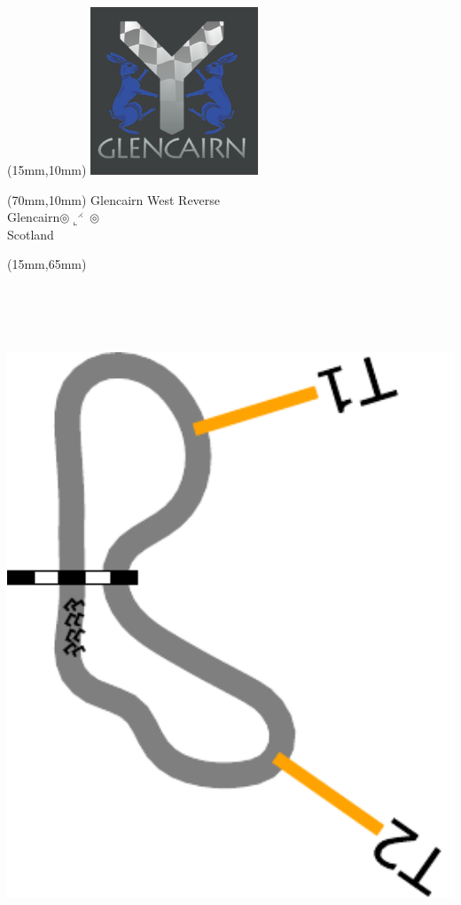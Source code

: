 \null\newpage
\begin{textblock*}{50mm}(15mm,10mm)%
\includegraphics[width=50mm]{LG/GLCN.png}
\end{textblock*}
\begin{textblock*}{130mm}(70mm,10mm)%
{\fontsize{20}{20}\selectfont Glencairn West Reverse\\}
{\fontsize{16}{16}\selectfont Glencairn\hfill $\circledcirc\llcorner^{\rightthreetimes}\circledcirc$\\}
{\fontsize{12}{12}\selectfont Scotland\\}
\end{textblock*}
\begin{textblock*}{185mm}(15mm,65mm)%
\centering
\mbox{\includegraphics[width=185mm,height=210mm,keepaspectratio]{PT/GLCNWR.pdf}}
\end{textblock*}
